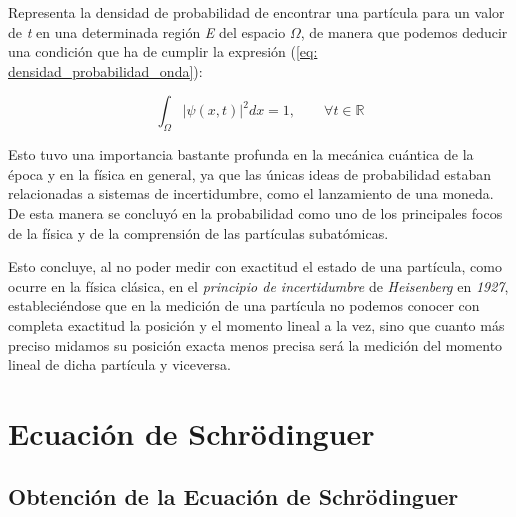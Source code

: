 \documentclass{article}
\numberwithin{equation}{section} %
\begin{document}
        \vspace{5mm}

        Representa la densidad de probabilidad de encontrar una partícula para un valor de \textit{t} en una determinada región \textit{E} del espacio \( \Omega \), de manera que podemos deducir una condición que ha de cumplir la expresión (\ref{eq: densidad_probabilidad_onda}):
        
        \vspace{5mm}

        \begin{equation}
            \int_{\Omega} \lvert \psi(x, t) \rvert ^ {2} dx = 1, \qquad \forall t \in \mathbb{R}
        \end{equation}

        \vspace{5mm}
        
        Esto tuvo una importancia bastante profunda en la mecánica cuántica de la época y en la física en general, ya que las únicas ideas de probabilidad estaban relacionadas a sistemas de incertidumbre, como el lanzamiento de una moneda. De esta manera se concluyó en la probabilidad como uno de los principales focos de la física y de la comprensión de las partículas subatómicas.

        \vspace{5mm}

        Esto concluye, al no poder medir con exactitud el estado de una partícula, como ocurre en la física clásica, en el \textit{principio de incertidumbre} de \textit{Heisenberg} en \textit{1927}, estableciéndose que en la medición de una partícula no podemos conocer con completa exactitud la posición y el momento lineal a la vez, sino que cuanto más preciso midamos su posición exacta menos precisa será la medición del momento lineal de dicha partícula y viceversa.

    \vspace{5mm}

    \newpage
    \thispagestyle{empty}
    \mbox{}

    \section{Ecuación de Schrödinguer}

    \subsection{Obtención de la Ecuación de Schrödinguer}
\end{document}
